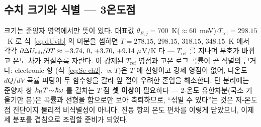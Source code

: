 \subsection{수치 크기와 식별 --- 3온도점}\label{ssec:einstein-numid}
크기는 준양자 영역에서만 뜻이 있다. 대표값 $\theta_{E,j}=700$~K($\approx60$~meV)$\cdot$$T_\mathrm{ref}=298.15$~K
로 식~\eqref{eq:dUvib} 의 미분을 셈하면 $T=278.15,\,298.15,\,318.15,\,348.15$~K 에서 각각 $\partial\Delta
U_{\mathrm{vib}}/\partial T\approx-3.74,\,0,\,+3.70,\,+9.14~\mu$V/K 다 --- $T_\mathrm{ref}$ 를 지나며 부호가 바뀌고 온도
차가 커질수록 자란다. 이 강제된 $T_\mathrm{ref}$ 영점과 고온 로그 곡률이 곧 식별의 근거다: electronic 항
(식~\eqref{eq:Se-ch2}, $\propto T$)은 $T$ 에 선형이고 강제 영점이 없어, 다온도 $dQ/dV$ 곡률 피팅이 두 함수형을
갈라 앞 절이 우려한 혼입을 해소한다. 단 분리에는 준양자 창 $k_{\mathrm B} T\!\sim\!\hbar\omega$ 를 걸치는 $T$ 점
\textbf{셋 이상}이 필요하다 --- 2-온도 유한차분(국소 기울기만 봄)은 곡률과 선형을 합으로만 보아 축퇴하므로,
``섞일 수 있다''는 것은 저-온도점 진단이지 물리적 비식별성이 아니다. 진동 항의 온도 편차를 이렇게 닫았으니,
이제 세 분포를 겹침으로 조립할 준비가 되었다.

